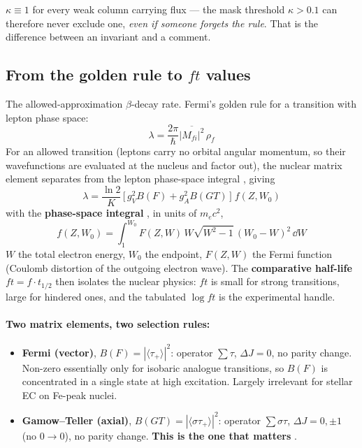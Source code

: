 $\kappa \equiv 1$ for every weak column carrying flux --- the mask threshold
$\kappa > 0.1$ can therefore never exclude one, \emph{even if someone forgets
the rule}. That is the difference between an invariant and a comment.

\subsection{From the golden rule to \texorpdfstring{$ft$}{ft} values}
\label{sec:goldenrule}

The allowed-approximation $\beta$-decay rate. Fermi's golden rule for a
transition with lepton phase space:
%
\begin{equation*}
\lambda = \frac{2\pi}{\hbar}\overline{|M_{fi}|^2}\,\rho_f
\end{equation*}
%
For an allowed transition (leptons carry no orbital angular momentum, so their
wavefunctions are evaluated at the nucleus and factor out), the nuclear matrix
element separates from the lepton phase-space integral \citep{langanke2000},
giving
%
\begin{equation}
\lambda = \frac{\ln 2}{K}\,\bigl[\,g_V^2 B(F) + g_A^2 B(GT)\,\bigr]\; f(Z,W_0)
\label{eq:betarate}
\end{equation}
%
with the \textbf{phase-space integral} \citep{langanke2000}, in units of
$m_ec^2$,
%
\begin{equation}
f(Z,W_0) = \int_1^{W_0} F(Z,W)\,W\sqrt{W^2-1}\,(W_0-W)^2\,\dd W
\label{eq:phasespaceint}
\end{equation}
%
$W$ the total electron energy, $W_0$ the endpoint, $F(Z,W)$ the Fermi function
(Coulomb distortion of the outgoing electron wave). The \textbf{comparative
half-life} $ft = f\cdot t_{1/2}$ then isolates the nuclear physics: $ft$ is
small for strong transitions, large for hindered ones, and the tabulated
$\log ft$ is the experimental handle.

\paragraph{Two matrix elements, two selection rules:}

\begin{itemize}
\item \textbf{Fermi (vector)}, $B(F) = |\langle\tau_+\rangle|^2$: operator
      $\sum\tau$, $\Delta J = 0$, no parity change. Non-zero essentially only
      for isobaric analogue transitions, so $B(F)$ is concentrated in a single
      state at high excitation. Largely irrelevant for stellar EC on Fe-peak
      nuclei.
\item \textbf{Gamow--Teller (axial)}, $B(GT) = |\langle\sigma\tau_+\rangle|^2$:
      operator $\sum\sigma\tau$, $\Delta J = 0, \pm1$ (no $0\to0$), no parity
      change. \textbf{This is the one that matters} \citep{langanke2003}.
\end{itemize}

